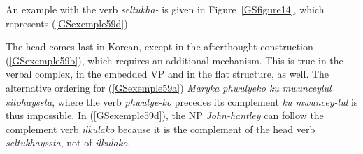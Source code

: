 \documentclass[output=paper
                ,modfonts
                ,nonflat
	        ,collection
	        ,collectionchapter
	        ,collectiontoclongg
 	        ,biblatex
                ,babelshorthands
                ,newtxmath
                ,draftmode
                ,colorlinks, citecolor=brown
]{./langsci/langscibook}
\begin{document}
{\begin{exe}
	\label{GSexemple60} 
	\begin{xlist}
	
	     \end{xlist}
\end{exe}

An example with the verb \textit{seltukha-} is given in Figure~\ref{GSfigure14}, which represents (\ref{GSexemple59d}).


The head comes last in Korean, except in the afterthought construction (\ref{GSexemple59b}), which requires an additional mechanism. This is true in the verbal complex, in the embedded VP and in the flat structure, as well. The alternative ordering for (\ref{GSexemple59a}) \textit{\*Maryka phwulyeko ku mwunceylul sitohayssta}, where the verb \textit{phwulye-ko} precedes its complement \textit{ku mwuncey-lul} is thus impossible. In (\ref{GSexemple59d}), the NP \textit{John-hantley} can follow the complement verb \textit{ilkulako} because it is the complement of the head verb \textit{seltukhayssta}, not of \textit{ilkulako}.  

}
\end{document}
